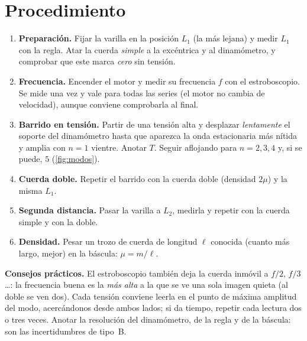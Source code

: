 \documentclass[a4paper,11pt]{article}
\begin{document}
\section{Procedimiento}
\begin{enumerate}
  \item \textbf{Preparación.} Fijar la varilla en la posición $L_1$ (la más
    lejana) y medir $L_1$ con la regla. Atar la cuerda \emph{simple} a la
    excéntrica y al dinamómetro, y comprobar que este marca \emph{cero} sin
    tensión.
  \item \textbf{Frecuencia.} Encender el motor y medir su frecuencia $f$ con el
    estroboscopio. Se mide una vez y vale para todas las series (el motor no
    cambia de velocidad), aunque conviene comprobarla al final.
  \item \textbf{Barrido en tensión.} Partir de una tensión alta y desplazar
    \emph{lentamente} el soporte del dinamómetro hasta que aparezca la onda
    estacionaria más nítida y amplia con $n=1$ vientre. Anotar $T$. Seguir
    aflojando para $n=2,3,4$ y, si se puede, $5$
    (\cref{fig:modos}).
  \item \textbf{Cuerda doble.} Repetir el barrido con la cuerda doble
    (densidad $2\mu$) y la misma $L_1$.
  \item \textbf{Segunda distancia.} Pasar la varilla a $L_2$, medirla y repetir
    con la cuerda simple y con la doble.
  \item \textbf{Densidad.} Pesar un trozo de cuerda de longitud $\ell$ conocida
    (cuanto más largo, mejor) en la báscula: $\mu=m/\ell$.
\end{enumerate}

\begin{consejo}
\small\textbf{Consejos prácticos.}
El estroboscopio también deja la cuerda inmóvil a $f/2$, $f/3$\ldots: la
frecuencia buena es la \emph{más alta} a la que se ve una sola imagen quieta
(al doble se ven dos). Cada tensión conviene leerla en el punto de máxima
amplitud del modo, acercándonos desde ambos lados; si da tiempo, repetir
cada lectura dos o tres veces. Anotar la resolución del dinamómetro, de la
regla y de la báscula: son las incertidumbres de tipo~B.
\end{consejo}
\end{document}

